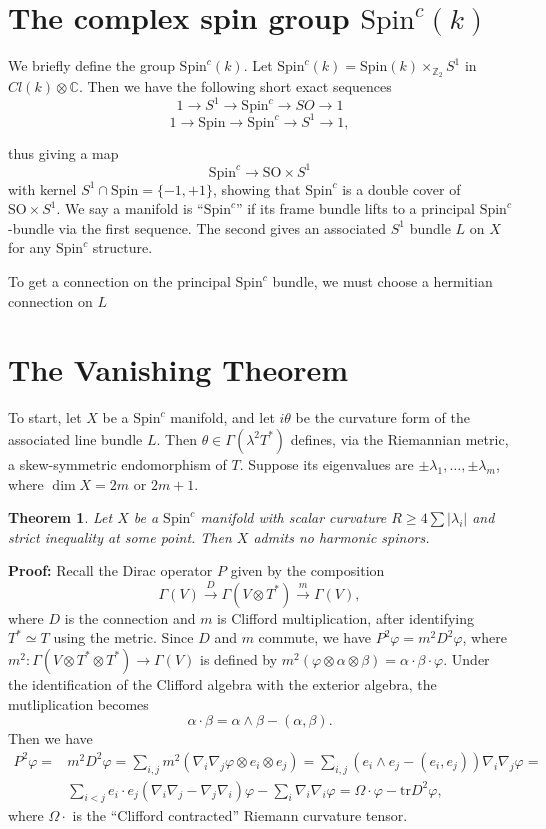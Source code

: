 \documentclass[11pt, reqno]{article}
\theoremstyle{plain}
\newtheorem*{theorem}{Theorem}
\theoremstyle{definition}
\theoremstyle{remark}
\renewcommand{\phi}{\varphi}
\newcommand{\ZZ}{\mathbb{Z}}
\newcommand{\CC}{\mathbb{C}}
\begin{document}
\section{The complex spin group $\text{Spin}^c(k)$}

We briefly define the group $\text{Spin}^c(k)$. Let $\text{Spin}^c(k) = \text{Spin}(k)\times_{\ZZ_2} S^1$ in $Cl(k)\otimes \CC$.
Then we have the following short exact sequences
\[
    1 \to S^1 \to \text{Spin}^c \to SO \to 1
\]
\[
    1 \to \text{Spin} \to \text{Spin}^c \to S^1 \to 1,
\]

thus giving a map
\[
    \text{Spin}^c \to \text{SO}\times S^1
\]
with kernel $S^1 \cap \text{Spin} = \{-1, +1\}$, showing that $\text{Spin}^c$ is a double cover of $\text{SO}\times S^1$.
We say a manifold is ``$\text{Spin}^c$'' if its frame bundle lifts to a principal $\text{Spin}^c$-bundle via the first sequence. The second
gives an associated $S^1$ bundle $L$ on $X$ for any $\text{Spin}^c$ structure.

To get a connection on the principal $\text{Spin}^c$ bundle, we must choose a hermitian connection on $L$

\section{The Vanishing Theorem}

To start, let $X$ be a $\text{Spin}^c$ manifold, and let $i\theta$ be the curvature form of the associated line
bundle $L$. Then $\theta \in \Gamma(\lambda^2 T^*)$ defines, via the Riemannian metric, a skew-symmetric 
endomorphism of $T$. Suppose its eigenvalues are $\pm\lambda_1, \dots, \pm \lambda_m$, where $\dim X = 2m$
or $2m + 1$. 

\begin{theorem}
    Let $X$ be a $\text{Spin}^c$ manifold with scalar curvature $R \geq 4\sum |\lambda_i|$ and strict inequality at some 
    point. Then $X$ admits no harmonic spinors. 
\end{theorem}

\textbf{Proof:} Recall the Dirac operator $P$ given by the composition
\[
    \Gamma(V) \overset{D}{\to} \Gamma(V\otimes T^*) \overset{m}{\to} \Gamma(V),
\]
where $D$ is the connection and $m$ is Clifford multiplication, after identifying $T^*\simeq T$ using the metric.
Since $D$ and $m$ commute, we have $P^2\phi = m^2 D^2 \phi$, where $m^2: \Gamma(V\otimes T^* \otimes T^*) \to \Gamma(V)$ 
is defined by $m^2(\phi\otimes\alpha\otimes\beta) = \alpha\cdot\beta\cdot\phi$. Under the identification of the Clifford algebra
with the exterior algebra, the mutliplication becomes
\[
    \alpha\cdot\beta = \alpha\wedge\beta - (\alpha,\beta).
\]
Then we have
\begin{align}
    P^2\phi = & m^2 D^2 \phi = \sum_{i,j} m^2(\nabla_i\nabla_j \phi \otimes e_i \otimes e_j) = 
    \sum_{i,j} (e_i \wedge e_j - (e_i, e_j))\nabla_i \nabla_j \phi = \\
    & \sum_{i < j} e_i \cdot e_j (\nabla_i\nabla_j - \nabla_j \nabla_i)\phi - \sum_{i} \nabla_i\nabla_i \phi = \Omega\cdot\phi - \text{tr} D^2 \phi,
\end{align}
where $\Omega\cdot$ is the ``Clifford contracted'' Riemann curvature tensor.
\end{document}
